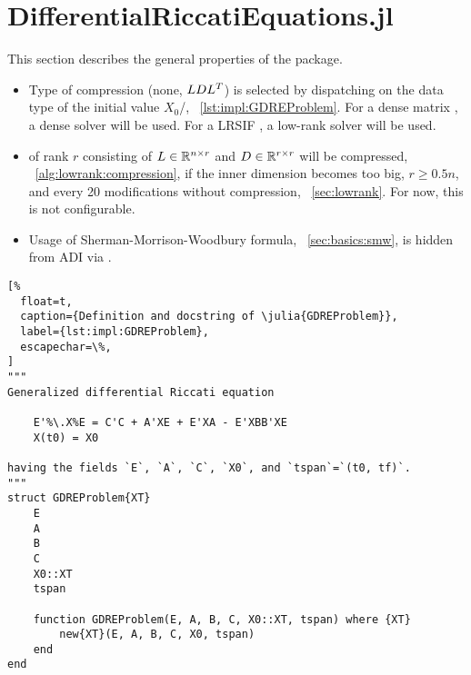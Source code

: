 \section{DifferentialRiccatiEquations.jl}
\label{sec:impl:DRE}

This section describes the general properties of the  package.

\begin{itemize}
  \item
    Type of compression (none, $LDL^T$) is selected by dispatching on the data type of the initial value $X_0$/,
    \cf~\autoref{lst:impl:GDREProblem}.
    For a dense matrix , a dense solver will be used.
    For a \ac{LRSIF} , a low-rank solver will be used.
  \item
     of rank $r$ consisting of $L \in\mathbb{R}^{n\times r}$ and $D\in\mathbb{R}^{r\times r}$ will be compressed,
    \cf~\autoref{alg:lowrank:compression},
    if the inner dimension becomes too big, $r \geq 0.5 n$,
    and every 20 modifications without compression,
    \cf~\autoref{sec:lowrank}.
    For now, this is not configurable.
  \item
    Usage of Sherman-Morrison-Woodbury formula, \cf~\autoref{sec:basics:smw},
    is hidden from \ac{ADI} via .
\end{itemize}

\begin{lstlisting}[%
  float=t,
  caption={Definition and docstring of \julia{GDREProblem}},
  label={lst:impl:GDREProblem},
  escapechar=\%,
]
"""
Generalized differential Riccati equation

    E'%\.X%E = C'C + A'XE + E'XA - E'XBB'XE
    X(t0) = X0

having the fields `E`, `A`, `C`, `X0`, and `tspan`=`(t0, tf)`.
"""
struct GDREProblem{XT}
    E
    A
    B
    C
    X0::XT
    tspan

    function GDREProblem(E, A, B, C, X0::XT, tspan) where {XT}
        new{XT}(E, A, B, C, X0, tspan)
    end
end
\end{lstlisting}
